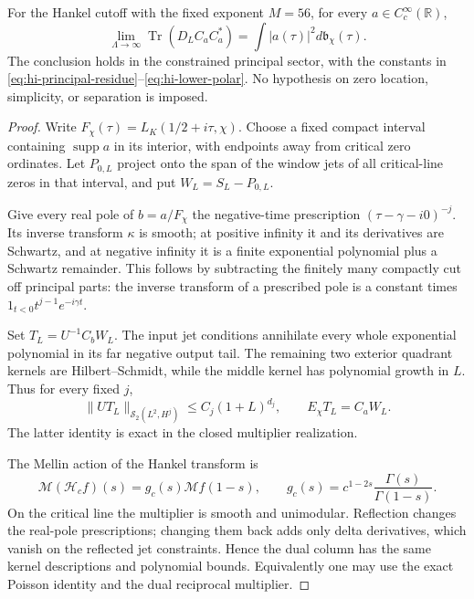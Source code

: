 \begin{theorem}\label{thm:hi-local-limit}
For the Hankel cutoff with the fixed exponent $M=56$, for every
$a\in C_c^\infty(\mathbb R)$,
\[
 \lim_{\Lambda\to\infty}\operatorname{Tr}(D_LC_aC_a^*)
                   =\int |a(\tau)|^2d\mathfrak b_\chi(\tau).
\]
The conclusion holds in the constrained principal sector, with the
constants in \eqref{eq:hi-principal-residue}--\eqref{eq:hi-lower-polar}.
No hypothesis on zero location, simplicity, or separation is imposed.
\end{theorem}
\begin{proof}
Write $F_\chi(\tau)=L_K(1/2+i\tau,\chi)$. Choose a fixed compact
interval containing $\operatorname{supp}a$ in its interior, with endpoints
away from critical zero ordinates. Let $P_{0,L}$ project onto the span of
the window jets of all critical-line zeros in that interval, and put
$W_L=S_L-P_{0,L}$.

Give every real pole of $b=a/F_\chi$ the negative-time prescription
$(\tau-\gamma-i0)^{-j}$. Its inverse transform $\kappa$ is smooth;
at positive infinity it and its derivatives are Schwartz, and at negative
infinity it is a finite exponential polynomial plus a Schwartz remainder.
This follows by subtracting the finitely many compactly cut off principal
parts: the inverse transform of a prescribed pole is a constant times
$1_{t<0}t^{j-1}e^{-i\gamma t}$.

Set $T_L=U^{-1}C_bW_L$. The input jet conditions annihilate every whole
exponential polynomial in its far negative output tail. The remaining
two exterior quadrant kernels are Hilbert--Schmidt, while the middle
kernel has polynomial growth in $L$. Thus for every fixed $j$,
\begin{equation}\label{eq:hi-fixed-bulk}
 \|UT_L\|_{\mathcal S_2(L^2,H^j)}\le C_j(1+L)^{d_j},
 \qquad E_\chi T_L=C_aW_L.
\end{equation}
The latter identity is exact in the closed multiplier realization.

The Mellin action of the Hankel transform is
\[
 \mathcal M(\mathcal H_cf)(s)
 =g_c(s)\mathcal Mf(1-s),
 \qquad g_c(s)=c^{1-2s}\frac{\Gamma(s)}{\Gamma(1-s)}.
\]
On the critical line the multiplier is smooth and unimodular.
Reflection changes the real-pole prescriptions; changing them back adds
only delta derivatives, which vanish on the reflected jet constraints.
Hence the dual column has the same kernel descriptions and polynomial
bounds. Equivalently one may use the exact Poisson identity and the dual
reciprocal multiplier.


\end{proof}
